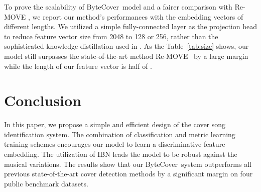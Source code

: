 \documentclass{article}
\newcommand{\tabref}[1]{\mbox{Table~\ref{#1}}}
\newcommand{\ourname}{ByteCover}
\begin{document}
To prove the scalability of \ourname\ model and a fairer comparison with Re-MOVE \cite{yesiler2020less}, we report our method's performances with the embedding vectors of different lengths. We utilized a simple fully-connected layer as the projection head to reduce feature vector size from 2048 to 128 or 256, rather than the sophisticated knowledge distillation used in \cite{yesiler2020less}. As the \tabref{tab:size} shows, our model still surpasses the state-of-the-art method Re-MOVE~\cite{yesiler2020less} by a large margin while the length of our feature vector is half of \cite{yesiler2020less}.




 











































  

 
\section{Conclusion}
In this paper, we propose a simple and efficient design of the cover song identification system.
The combination of classification and metric learning training schemes encourages our model to learn a discriminative feature embedding. The utilization of IBN leads the model to be robust against the musical variations. The results show that our \ourname\ system outperforms all previous state-of-the-art cover detection methods by a significant margin on four public benchmark datasets.   

 



\vfill\pagebreak





\end{document}

